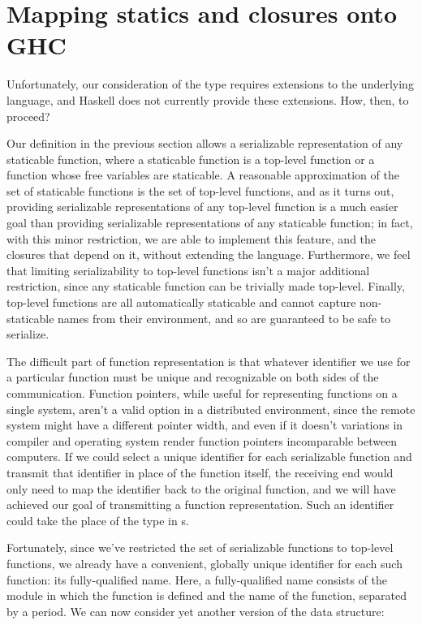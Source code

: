 \documentclass[preprint]{sigplanconf}
\begin{document}
\section{Mapping statics and closures onto GHC}

Unfortunately, our consideration of the  type 
requires extensions to the underlying language, and Haskell does not currently provide these extensions. How, then, to proceed?

Our definition in the previous section allows a serializable representation of any staticable function, where a staticable function is a top-level function or a function whose free variables are staticable. A reasonable approximation of the set of staticable functions is the set of top-level functions, and as it turns out, providing serializable representations of any top-level function is a much easier goal than providing serializable representations of any staticable function; in fact, with this minor restriction, we are able to implement this feature, and the closures that depend on it, without extending the language. Furthermore, we feel that limiting serializability to top-level functions isn't a major additional restriction, since any staticable function can be trivially made top-level. Finally, top-level functions are all automatically staticable and cannot capture non-staticable names from their environment, and so are guaranteed to be safe to serialize.

The difficult part of function representation is that whatever identifier we use for a particular function must be unique and recognizable on both sides of the communication. Function pointers, while useful for representing functions on a single system, aren't a valid option in a distributed environment, since the remote system might have a different pointer width, and even if it doesn't variations in compiler and operating system render function pointers incomparable between computers. If we could select a unique identifier for each serializable function and transmit that identifier in place of the function itself, the receiving end would only need to map the identifier back to the original function, and we will have achieved our goal of transmitting a function representation. Such an identifier could take the place of the  type in s.

Fortunately, since we've restricted the set of serializable functions to top-level functions, we already have a convenient, globally unique identifier for each such function: its fully-qualified name. Here, a fully-qualified name consists of the module in which the function is defined and the name of the function, separated by a period. We can now consider yet another version of the  data structure:
\end{document}
